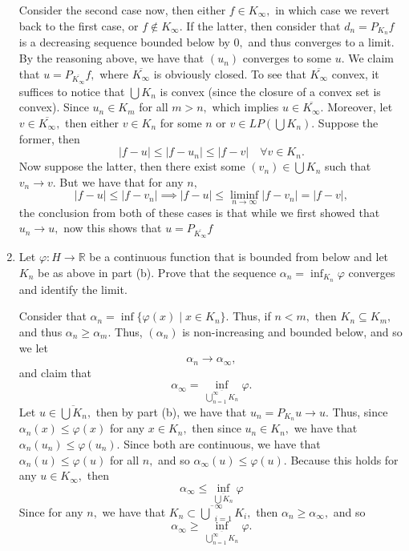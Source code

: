 \documentclass[11pt]{article}
\begin{document}
\begin{problem}
\begin{enumerate}
\begin{solution}
       Consider the second case now, then either $f\in K_\infty,$ in which case we revert back to the first case, or $f\notin K_\infty.$ If the latter, then consider that $d_n = P_{K_n}f$ is a decreasing sequence bounded below by $0,$ and thus converges to a limit. By the reasoning above, we have that $(u_n)$ converges to some $u.$ We claim that $u = P_{\overline{K_\infty}}f,$ where $\overline{K_\infty}$ is obviously closed. To see that $\overline{K_\infty}$ convex, it suffices to notice that $\bigcup K_n$ is convex (since the closure of a convex set is convex). Since $u_n \in K_m$ for all $m> n,$ which implies $u \in \overline{K_\infty}.$ Moreover, let $v\in \overline{K_\infty},$ then either $v\in K_n$ for some $n$ or $v\in LP(\bigcup K_n).$ Suppose the former, then
       \[|f - u|\leq |f-u_n| \leq |f-v| \quad \forall v\in K_n.\] Now suppose the latter, then there exist some $(v_n)\in \bigcup K_n$ such that $v_n \to v.$ But we have that for any $n,$
       \[|f-u| \leq |f - v_n| \implies |f-u| \leq \liminf_{n\to \infty}|f-v_n| = |f-v|,\]
        the conclusion from both of these cases is that while we first showed that $u_n \to u,$ now this shows that $u  = P_{\overline{K_\infty}}f$
   \end{solution}
   
   \item Let \( \varphi : H \to \mathbb{R} \) be a continuous function that is bounded from below and let $K_n$ be as above in part (b). Prove that the sequence \( \alpha_n = \inf_{K_n} \varphi \) converges and identify the limit. 
   \begin{solution}
       Consider that $\alpha_n = \inf\{\varphi(x) \; | \; x\in K_n\}.$ Thus, if $n< m,$ then $K_n \subseteq K_m,$ and thus $\alpha_n \geq \alpha_m.$ Thus, $(\alpha_n)$ is non-increasing and bounded below, and so we let 
       \[\alpha_n \to \alpha_\infty,\] and claim that 
       \[\alpha_\infty = \inf_{\overline{\bigcup_{n=1}^\infty K_n}}\varphi.\] Let $u \in \overline{\bigcup K_n},$ then by part (b), we have that $u_n = P_{K_n}u \to u.$ Thus, since $\alpha_n(x) \leq \varphi(x)$ for any $x\in K_n,$ then since $u_n \in K_n,$ we have that $\alpha_n(u_n)\leq \varphi(u_n).$ Since both are continuous, we have that $\alpha_n(u) \leq \varphi(u)$ for all $n,$ and so $\alpha_\infty(u)\leq \varphi(u).$ Because this holds for any $u \in K_\infty,$ then 
       \[\alpha_\infty \leq \inf_{\overline{\bigcup K_n}}\varphi\]
       Since for any $n,$ we have that $K_n \subset \overline{\bigcup}_{i=1}^\infty K_i,$ then $\alpha_n \geq \alpha_\infty,$ and so \[\alpha_\infty \geq \inf_{\overline{\bigcup_{n=1}^\infty K_n}}\varphi.\] 
       

\end{solution}
\end{enumerate}
\end{problem}
\end{document}

